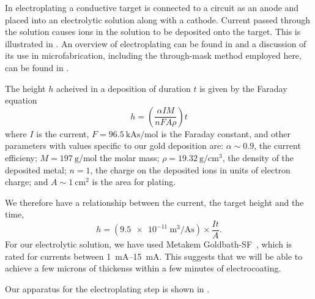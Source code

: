 In electroplating a conductive target is connected to a circuit as an anode and
placed into an electrolytic solution along with a cathode. Current passed
through the solution causes ions in the solution to be deposited onto the
target. This is illustrated in . An overview
of electroplating can be found in  and a
discussion of its use in microfabrication, including the through-mask method
employed here, can be found in .

The height $h$ acheived in a deposition of duration $t$ is given by the Faraday
equation~\cite{Ruythooren_2000}
%
\begin{equation}
  h = \left(\frac{\alpha I M}{nFA\rho}\right)t
\end{equation}
%
where $I$ is the current, $F=\SI{96.5}{\kilo\ampere\second\per\mole}$ is the
Faraday constant, and other parameters with values specific to our gold
deposition are: $\alpha\sim0.9$, the current efficieny; $M =
\SI{197}{\gram\per\mole}$ the molar mass;
$\rho=\SI{19.32}{\gram\per\centi\meter\cubed}$, the density of the deposited
metal; $n=1$, the charge on the deposited ions in units of electron charge; and
$A\sim\SI{1}{\centi\meter\squared}$ is the area for plating.

We therefore have a relationship between the current, the target height and the
time,
%
\begin{equation}
  h = \left(\SI[per-mode=fraction]{9.5e-11}{\meter\cubed\per\ampere\second}
  \right) \times\frac{It}{A}.
\end{equation}
%
For our electrolytic solution, we have used Metakem Goldbath-SF~\cite{}, which
is rated for currents between \SI{1}{\milli\ampere}--\SI{15}{\milli\ampere}.
This suggests that we will be able to achieve a few microns of thickenss within
a few minutes of electrocoating.

Our apparatus for the electroplating step is shown in
. 





